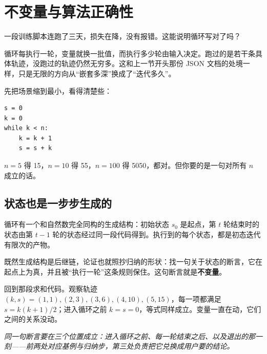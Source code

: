 \section{不变量与算法正确性}
\label{sec:01-Mathematical-Language/04-Induction-and-Recursion/04}

一段训练脚本连跑了三天，损失在降，没有报错。这能说明循环写对了吗？

循环每执行一轮，变量就换一批值，而执行多少轮由输入决定。跑过的是若干条具体轨迹，没跑过的轨迹仍然无穷多。这和上一节开头那份 JSON 文档的处境一样，只是无限的方向从``嵌套多深''换成了``迭代多久''。

先把场景缩到最小，看得清楚些：

\begin{verbatim}
s = 0
k = 0
while k < n:
    k = k + 1
    s = s + k
\end{verbatim}

\(n=5\) 得 15，\(n=10\) 得 55，\(n=100\) 得 5050，都对。但你要的是一句对所有 \(n\) 成立的话。

\subsection{状态也是一步步生成的}

循环有一个和自然数完全同构的生成结构：初始状态 \(s_0\) 是起点，第 \(t\) 轮结束时的状态由第 \(t-1\) 轮的状态经过同一段代码得到。执行到的每个状态，都是初态迭代有限次的产物。

既然生成结构是后继链，论证也就照抄归纳的形状：找一句关于状态的断言，它在起点上为真，并且被``执行一轮''这条规则保住。这句断言就是\textbf{不变量}。

回到那段求和代码。观察轨迹 \((k,s)=(1,1),(2,3),(3,6),(4,10),(5,15)\)，每一项都满足 \(s=k(k+1)/2\)；进入循环之前 \(k=s=0\)，等式同样成立。变量一直在动，它们之间的关系没动。

\begin{center}

\emph{同一句断言要在三个位置成立：进入循环之前、每一轮结束之后、以及退出的那一刻——前两处对应基例与归纳步，第三处负责把它兑换成用户要的结论。}
\end{center}

